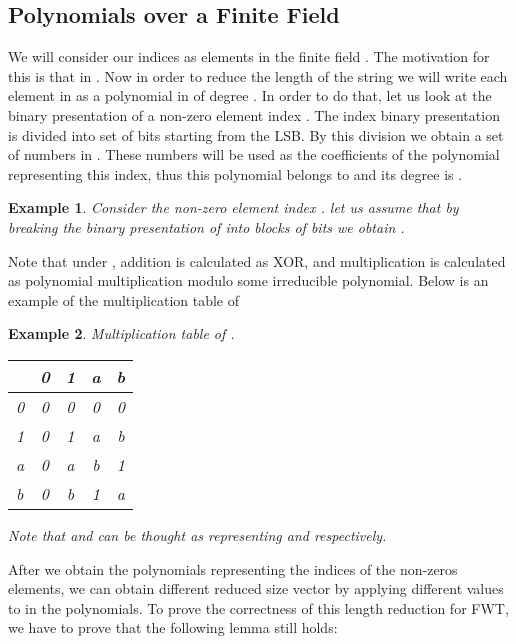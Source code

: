 \documentclass[11pt,amssymb]{article}
\newtheorem{example}{Example}
\begin{document}
\subsection{Polynomials over a Finite Field}\label{ss:poly_fwt}

We will consider our indices as elements in the finite field
. The motivation for this is that  in .
Now in order to reduce the length of the string we will write each
element in  as a polynomial in  of degree
. In order to do that, let us look at the binary
presentation of a non-zero element index . The
index binary presentation is divided into set of  bits starting
from the LSB. By this division we obtain a set of 
numbers in . These numbers will be used as the
coefficients of the polynomial representing this index, thus this
polynomial belongs to  and its degree is
. 

\begin{example} 

Consider the non-zero element index . let us assume that
 by breaking the binary presentation of  into blocks of 
bits we obtain . 

\end{example}

Note that under , addition is calculated as XOR, and
multiplication is calculated as polynomial multiplication modulo some
irreducible polynomial. Below is an example of the multiplication
table of  

\begin{example} Multiplication table of . 

\begin{tabular}{|l|c|c|c|c|}
\hline
 & 0 & 1 & a & b \\
\hline\hline
0 & 0 & 0 & 0 & 0\\
\hline
1 & 0 & 1 & a & b\\
\hline
a & 0 & a & b & 1\\
\hline
b & 0 & b & 1 & a\\
\hline
\end{tabular}

Note that  and  can be thought as representing  and  respectively.
\end{example}

After we obtain the polynomials representing
the indices of the non-zeros elements, we can obtain different reduced
size vector by applying different values to  in the
polynomials. 
To prove the correctness of this length reduction for FWT, we have to
prove that the following lemma still holds: 
\end{document}
